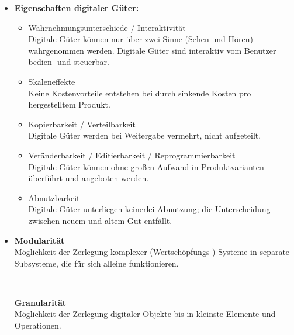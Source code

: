\documentclass[12pt,a4paper]{article}
\begin{document}
\begin{itemize}
   \item \textbf{Eigenschaften digitaler Güter:}
         \begin{itemize}
            \item Wahrnehmungsunterschiede / Interaktivität\\
                  Digitale Güter können nur über zwei Sinne (Sehen und Hören) wahrgenommen werden.
                  Digitale Güter sind interaktiv vom Benutzer bedien- und steuerbar.
            \item Skaleneffekte\\
                  Keine Kostenvorteile entstehen bei durch sinkende Kosten pro hergestelltem Produkt.
            \item Kopierbarkeit / Verteilbarkeit\\
                  Digitale Güter werden bei Weitergabe vermehrt, nicht aufgeteilt.
            \item Veränderbarkeit / Editierbarkeit / Reprogrammierbarkeit\\
                  Digitale Güter können ohne großen Aufwand in Produktvarianten überführt und angeboten werden.
            \item Abnutzbarkeit\\
                  Digitale Güter unterliegen keinerlei Abnutzung; die Unterscheidung zwischen neuem und altem Gut entfällt.
         \end{itemize}

   \item \begin{minipage}[t]{0.43\textwidth}
            \textbf{Modularität} \\
            Möglichkeit der Zerlegung komplexer (Wertschöpfungs-) Systeme in separate Subsysteme, die für sich alleine funktionieren.
         \end{minipage} \begin{minipage}[t]{0.05\textwidth}
            \ \\
         \end{minipage} \begin{minipage}[t]{0.43\textwidth}
            \textbf{Granularität} \\
            Möglichkeit der Zerlegung digitaler Objekte bis in kleinste Elemente und Operationen.
         \end{minipage}


\end{itemize}
\end{document}
